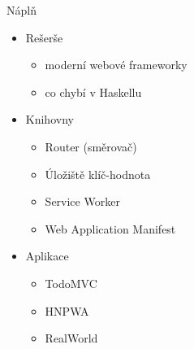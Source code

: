 \documentclass[presentation]{beamer}
\begin{document}
\begin{frame}{Náplň}
  \begin{itemize}
    \item Rešerše
      \begin{itemize}
        \item moderní webové frameworky
        \item co chybí v Haskellu
      \end{itemize}\medskip
    \item Knihovny
      \begin{itemize}
        \item Router (směrovač)
        \item Úložiště klíč-hodnota
        \item Service Worker
        \item Web Application Manifest
      \end{itemize}\medskip
    \item Aplikace
      \begin{itemize}
        \item TodoMVC
        \item HNPWA
        \item RealWorld
      \end{itemize}
  \end{itemize}
\end{frame}
\end{document}
